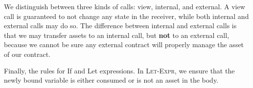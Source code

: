 \documentclass[dvipsnames, usenames, sigconf]{acmart}
\begin{document}
We distinguish between three kinds of calls: view, internal, and external.
A view call is guaranteed to not change any state in the receiver, while both internal and external calls may do so.
The difference between internal and external calls is that we may transfer assets to an internal call, but \textbf{not} to an external call, because we cannot be sure any external contract will properly manage the asset of our contract.
\begin{mathpar}



\end{mathpar}

Finally, the rules for If and Let expressions.
In \textsc{Let-Expr}, we ensure that the newly bound variable is either consumed or is not an asset in the body.
\begin{mathpar}

\end{mathpar}
\end{document}
